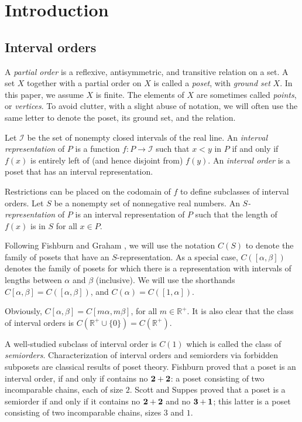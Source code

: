 \section{Introduction}

\subsection{Interval orders}
A \emph{partial order} is a reflexive, antisymmetric, and transitive relation on a set. A set $X$ together with a partial order on $X$ is called a \emph{poset}, with \emph{ground set} $X$. In this paper, we assume $X$ is finite. The elements of $X$ are sometimes called \emph{points}, or \emph{vertices}. To avoid clutter, with a slight abuse of notation, we will often use the same letter to denote the poset, its ground set, and the relation.

Let $\mathcal{I}$ be the set of nonempty closed intervals of the real line.
An \emph{interval representation} of $P$ is a function $f:P\to\mathcal{I}$ such that $x<y$ in $P$ if and only if $f(x)$ is entirely left of (and hence disjoint from) $f(y)$. An \emph{interval order} is a poset that has an interval representation.

Restrictions can be placed on the codomain of $f$ to define subclasses of interval orders. Let $S$ be a nonempty set of nonnegative real numbers. An \emph{$S$-representation} of $P$ is an interval representation of $P$ such that the length of $f(x)$ is in $S$ for all $x\in P$.

Following Fishburn and Graham \cite{FG-85}, we will use the notation $C(S)$ to denote the family of posets that have an $S$-representation. As a special case, $C([\alpha,\beta])$ denotes the family of posets for which there is a representation with intervals of lengths between $\alpha$ and $\beta$ (inclusive). We will use the shorthands $C[\alpha,\beta]=C([\alpha,\beta])$, and $C(\alpha)=C([1,\alpha])$.

Obviously, $C[\alpha, \beta] = C[m\alpha, m\beta]$, for all $m\in\mathbb{R}^+$. It is also clear that the class of interval orders is $C(\mathbb{R}^+\cup\{0\})=C(\mathbb{R}^+)$.

A well-studied subclass of interval order is $C(1)$ which is called the class of \emph{semiorders}. Characterization of interval orders and semiorders via forbidden subposets are classical results of poset theory. Fishburn \cite{F-70} proved that a poset is an interval order, if and only if contains no $\mathbf{2}+\mathbf{2}$: a poset consisting of two incomparable chains, each of size $2$. Scott and Suppes \cite{SS-58} proved that a poset is a semiorder if and only if it contains no $\mathbf{2}+\mathbf{2}$ and no $\mathbf{3}+\mathbf{1}$; this latter is a poset consisting of two incomparable chains, sizes $3$ and $1$.

